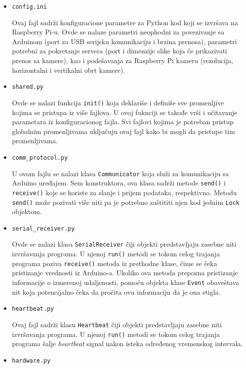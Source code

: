 \documentclass[12pt,a4paper]{report}
\begin{document}
\begin{itemize}
\vspace{-1mm}
\item \texttt{config.ini}

Ovaj fajl sadrži konfiguracione parametre za Python kod koji se izvršava na Raspberry Pi-u. Ovde se nalaze parametri neophodni za povezivanje sa Arduinom (port za USB serijsku komunikaciju i brzina prenosa), parametri potrebni za pokretanje servera (port i dimenzije slike koja će prikazivati prenos sa kamere), kao i podešavanja za Raspberry Pi kameru (rezolucija, horizontalni i vertikalni obrt kamere).
\vspace{-1mm}
\item \texttt{shared.py}

Ovde se nalazi funkcija \texttt{init()} koja deklariše i definiše sve promenljive kojima se pristupa iz više fajlova. U ovoj fuknciji se takođe vrši i učitavanje parametara iz konfiguracionog fajla. Svi fajlovi kojima je potreban pristup globalnim promenljivama uključuju ovaj fajl kako bi mogli da pristupe tim promenljivama.
\vspace{-1mm}
\item \texttt{comm\_protocol.py}

U ovom fajlu se nalazi klasa \texttt{Communicator} koja služi za komunikaciju sa Arduino uređajem. Sem konstruktora, ova klasa sadrži metode \texttt{send()} i \texttt{receive()} koje se koriste za slanje i prijem podataka, respektivno. Metodu \texttt{send()} može pozivati više niti pa je potrebno zaštititi njen kod jednim \texttt{Lock} objektom.
\vspace{-1mm}
\item \texttt{serial\_receiver.py}

Ovde se nalazi klasa \texttt{SerialReceiver} čiji objekti predstavljaju zasebne niti izvršavanja programa. U njenoj \texttt{run()} metodi se tokom celog trajanja programa poziva \texttt{receive()} metoda iz prethodne klase, čime se čeka pristizanje vrednosti iz Arduino-a. Ukoliko ova metoda prepozna pristizanje informacije o izmerenoj udaljenosti, pomoću objekta klase \texttt{Event} obaveštava nit koja potencijalno čeka da pročita ovu informaciju da je ona stigla.
\vspace{-1mm}
\item \texttt{heartbeat.py}

Ovaj fajl sadrži klasu \texttt{Heartbeat} čiji objekti predstavljaju zasebne niti izvršavanja programa. U njenoj \texttt{run()} metodi se tokom celog trajanja programa šalje \textit{heartbeat} signal nakon isteka određenog vremenskog intervala.
\vspace{-1mm}
\item \texttt{hardware.py}


\end{itemize}
\end{document}
